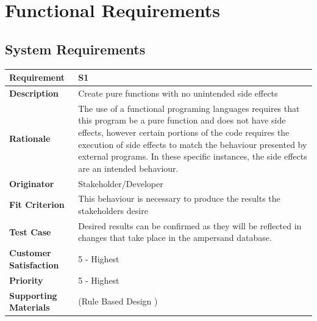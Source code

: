 \documentclass[12pt]{report}
\begin{document}
\section{Functional Requirements}\label{sec:Functional}

\subsection{System Requirements}
{\setlength{\tabcolsep}{6pt} %
    \begin{tabularx}{\textwidth}{>{\bfseries}m{3cm}X}
        Requirement & S1 \\ 
        \midrule
        \endhead
        Description  & Create pure functions with no unintended side effects
        \\	Rationale & The use of a functional programing languages requires 
        that this program be a pure function and does not have side effects, 
        however certain portions of the code requires the execution of side 
        effects to match the behaviour presented by external programs. In these 
        specific instances, the side effects are an intended behaviour.
        \\	Originator & Stakeholder/Developer
        
        \\	Fit Criterion & This behaviour is necessary to produce the results 
        the stakeholders desire
        \\ Test Case & Desired results can be confirmed as they will be 
        reflected in changes that take place in the ampersand database.
        \\	Customer Satisfaction & 5 - Highest 
        \\	Priority & 5 - Highest 
        \\	Supporting Materials & (Rule Based Design \cite {RBD})
        \vspace{12pt}
    \end{tabularx}
}
\end{document}

